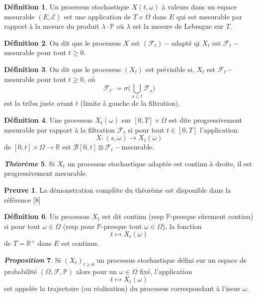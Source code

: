 \documentclass[12pt,a4paper,twoside]{book}%
\theoremstyle{definition}
\newtheorem{dfn}{Définition}[section]
\newtheorem*{pr}{\textbf{Preuve}}
\newtheorem{thm}[dfn]{\textit{Théorème}}
\newtheorem{prop}[dfn]{\textit{Proposition}}
\numberwithin{equation}{section}
\begin{document}
\begin{dfn}
	Un processus stochastique $X(t,\omega)$ à valeurs dans un espace mesurable $(E,\mathcal{E})$ est une application de $T\times\Omega$ dans $E$ qui est mesurable par rapport à la mesure du produit $\lambda\cdot\mathbb{P}$ où $\lambda$ est la mesure de Lebesgue sur $T$. 
\end{dfn}
\begin{dfn}
	On dit que le processus $X$ est $(\mathcal{F}_t)-$adapté qi $X_t$ est $\mathcal{F}_t-$mesurable pour tout $t\geq0.$
\end{dfn}	
\begin{dfn}
	On dit que le processus $(X_t)$ est prévisible si, $X_t$ est $\mathcal{F}_{t^-}$-mesurable pour tout $t\geq0$, où
	\[
	\mathcal{F}_{t^-} =\sigma\Big(\bigcup_{s\leq t}\mathcal{F}_s\Big)
	\]
	est la tribu juste avant $t$ (limite à gauche de la filtration).
\end{dfn}
\begin{dfn}
	Une processus $X_t(\omega)$ sur $[0,T]\times\Omega$ est dite progressivement mesurable par rapport à la filtration $\mathcal{F}_t$ si pour tout $t\in[0,T]$ l'application:
	\[
	X: (s,\omega)\to X_t(\omega)
	\]
	de $[0,t]\times\Omega\to\mathbb{R}$ est $\mathcal{B}[0,t]\otimes\mathcal{F}_t-$mesurable.
\end{dfn}
\begin{thm}
Si $X_t$ un processus stochastique adaptée est continu à droite, il est progressivement mesurable.
\end{thm}
\begin{pr}
La démonstration complète du théorème est disponible dans la référence [8]
\end{pr}
\begin{dfn}
Un processus $X_t$ est dit continu (resp $\mathbb{P}$-presque sûrement continu) si pour tout $\omega\in\Omega$ (resp pour $\mathbb{P}$-presque tout $\omega\in\Omega$), la fonction 
\[
t \longmapsto X_t(\omega)
\] de $T=\mathbb{R}^+$ dans $E$ est continus.
\end{dfn}
\begin{prop}
	Si $(X_t)_{t\geq0}$ un processus stochastique défini sur un espace de probabilité $(\Omega,\mathcal{F},\mathbb{P})$ alors pour un $\omega\in\Omega$ fixé, l'application
	\[
	t\longmapsto X_t(\omega)
	\]
	est appelée la trajectoire (ou réalisation) du processus correspondant à l'issue $\omega$.
\end{prop}
\end{document}
